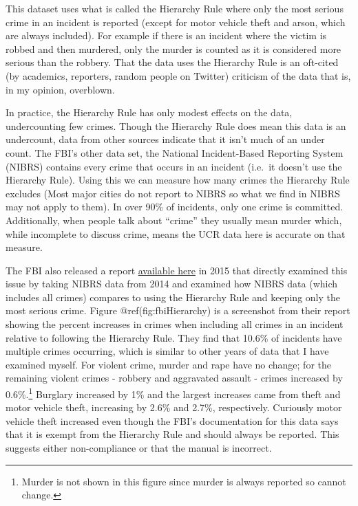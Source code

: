 \documentclass[
  12pt,
  openany]{book}
\begin{document}
This dataset uses what is called the Hierarchy Rule where only the most serious crime in an incident is reported (except for motor vehicle theft and arson, which are always included). For example if there is an incident where the victim is robbed and then murdered, only the murder is counted as it is considered more serious than the robbery. That the data uses the Hierarchy Rule is an oft-cited (by academics, reporters, random people on Twitter) criticism of the data that is, in my opinion, overblown.

In practice, the Hierarchy Rule has only modest effects on the data, undercounting few crimes. Though the Hierarchy Rule does mean this data is an undercount, data from other sources indicate that it isn't much of an under count. The FBI's other data set, the National Incident-Based Reporting System (NIBRS) contains every crime that occurs in an incident (i.e.~it doesn't use the Hierarchy Rule). Using this we can measure how many crimes the Hierarchy Rule excludes (Most major cities do not report to NIBRS so what we find in NIBRS may not apply to them). In over 90\% of incidents, only one crime is committed. Additionally, when people talk about ``crime'' they usually mean murder which, while incomplete to discuss crime, means the UCR data here is accurate on that measure.

The FBI also released a report \href{https://ucr.fbi.gov/nibrs/2014/resource-pages/effects_of_nibrs_on_crime_statistics_final.pdf}{available here} in 2015 that directly examined this issue by taking NIBRS data from 2014 and examined how NIBRS data (which includes all crimes) compares to using the Hierarchy Rule and keeping only the most serious crime. Figure @ref(fig:fbiHierarchy) is a screenshot from their report showing the percent increases in crimes when including all crimes in an incident relative to following the Hierarchy Rule. They find that 10.6\% of incidents have multiple crimes occurring, which is similar to other years of data that I have examined myself. For violent crime, murder and rape have no change; for the remaining violent crimes - robbery and aggravated assault - crimes increased by 0.6\%.\footnote{Murder is not shown in this figure since murder is always reported so cannot change.} Burglary increased by 1\% and the largest increases came from theft and motor vehicle theft, increasing by 2.6\% and 2.7\%, respectively. Curiously motor vehicle theft increased even though the FBI's documentation for this data says that it is exempt from the Hierarchy Rule and should always be reported. This suggests either non-compliance or that the manual is incorrect.
\end{document}
